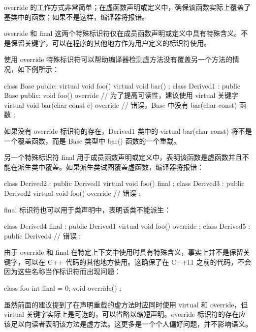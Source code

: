 
override 的工作方式非常简单；在虚函数声明或定义中，确保该函数实际上覆盖了基类中的函数；如果不是这样，编译器将报错。

override 和 final 这两个特殊标识符仅在成员函数声明或定义中具有特殊含义。不是保留关键字，可以在程序的其他地方作为用户定义的标识符使用。

使用 override 特殊标识符可以帮助编译器检测虚方法没有覆盖另一个方法的情况，如下例所示：

\begin{cpp}
class Base
{
    public:
    virtual void foo() {}
    virtual void bar() {}
};
class Derived1 : public Base
{
    public:
    void foo() override {}
    // 为了提高可读性，建议使用 virtual 关键字
    virtual void bar(char const c) override {}
    // 错误，Base 中没有 bar(char const) 函数
};
\end{cpp}

如果没有 override 标识符的存在，Derived1 类中的 virtual bar(char const) 将不是一个覆盖函数，而是 Base 类型中 bar() 函数的一个重载。

另一个特殊标识符 final 用于成员函数声明或定义中，表明该函数是虚函数并且不能在派生类中覆盖。如果派生类试图覆盖虚函数，编译器将报错：

\begin{cpp}
class Derived2 : public Derived1
{
    virtual void foo() final {}
};
class Derived3 : public Derived2
{
    virtual void foo() override {} // 错误
};
\end{cpp}

final 标识符也可以用于类声明中，表明该类不能派生：

\begin{cpp}
class Derived4 final : public Derived1
{
    virtual void foo() override {}
};
class Derived5 : public Derived4 // 错误
{
};
\end{cpp}

由于 override 和 final 在特定上下文中使用时具有特殊含义，事实上并不是保留关键字，可以在 C++ 代码的其他地方使用。这确保了在 C++11 之前的代码，不会因为这些名称当作标识符而出现问题：

\begin{cpp}
class foo
{
    int final = 0;
    void override() {}
};
\end{cpp}

虽然前面的建议提到了在声明重载的虚方法时应同时使用 virtual 和 override，但 virtual 关键字实际上是可选的，可以省略以缩短声明。override 标识符的存在应该足以向读者表明该方法是虚方法。这更多是一个个人偏好问题，并不影响语义。










